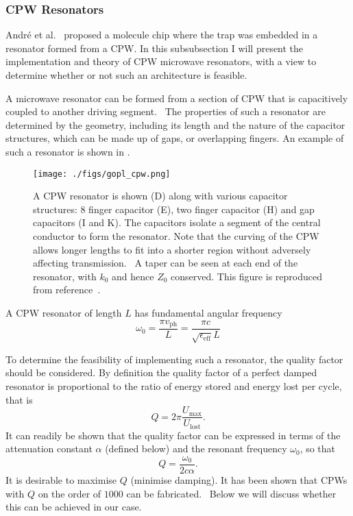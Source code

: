 \subsubsection{CPW Resonators}
\label{experiment:mw:resonator}

Andr\'e et al.~\cite{Andre2006} proposed a molecule chip where the trap was
embedded in a resonator formed from a CPW. In this subsubsection I will present
the implementation and theory of CPW microwave resonators, with a view to
determine whether or not such an architecture is feasible.

A microwave resonator can be formed from a section of CPW that is capacitively
coupled to another driving segment.~\cite{Day2003} The properties of such a
resonator are determined by the geometry, including its length and the nature
of the capacitor structures, which can be made up of gaps, or overlapping
fingers. An example of such a resonator is shown in
.~\cite{doi:10.1063/1.3010859, Pain1999}

\begin{figure}
  \texttt{[image: ./figs/gopl\_cpw.png]}
  \caption{
    A CPW resonator is shown (D) along with various capacitor structures: 8
    finger capacitor (E), two finger capacitor (H) and gap capacitors (I and K).
    The capacitors isolate a segment of the central conductor to form the
    resonator. Note that the curving of the CPW allows longer lengths to fit
    into a shorter region without adversely affecting
    transmission.~\cite{Simons2004} A taper can be seen at each end of the
    resonator, with $k_0$ and hence $Z_0$ conserved.
    This figure is reproduced from reference~\cite{doi:10.1063/1.3010859}.
  }
  \label{experiment:fig:resonator}
\end{figure}

A CPW resonator of length $L$ has fundamental angular frequency
\begin{equation}
  \omega_0 = \frac{\pi v_\mathrm{ph}}{L} = \frac{\pi
  c}{\sqrt{\epsilon_\text{eff}} L}
\end{equation}

To determine the feasibility of implementing such a resonator, the quality
factor should be considered. By definition the quality factor of a perfect
damped resonator is proportional to the ratio of energy stored and energy lost
per cycle, that is~\cite{Pain1999}
\begin{equation}
  Q = 2\pi\frac{U_\mathrm{max}}{U_\mathrm{lost}}.
  \label{experiment:mw:eqn:Qdef}
\end{equation}
It can readily be shown that the quality factor can be expressed in terms of the
attenuation constant $\alpha$ (defined below) and the resonant frequency
$\omega_0$, so that~\cite{Simons2004}
\begin{equation}
  Q = \frac{\omega_0}{2c\alpha}.
  \label{experiment:mw:eqn:Qalpha}
\end{equation}
It is desirable to maximise $Q$ (minimise damping). It has been shown that CPWs
with $Q$ on the order of $1000$ can be fabricated.~\cite{doi:10.1063/1.3010859,
Hattermann2017} Below we will discuss whether this can be achieved in our case.

